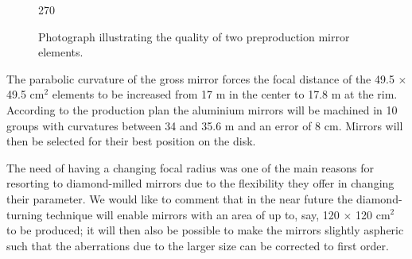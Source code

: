 \begin{figure}[htb]
\begin{center}
\begin{turn}{270}
\epsfxsize=9.2cm
\end{turn}
\caption{Photograph illustrating the
quality of two preproduction mirror elements.}
\label{fig-quality}
\end{center}
\end{figure}




The parabolic curvature of the gross mirror forces the focal distance of the
49.5 $\times$ 49.5 cm$^2$ elements to be increased from 17 m in the center
to 17.8 m at the rim. According to the production plan the aluminium mirrors
will be machined in 10 groups with curvatures between 34 and 35.6 m and an
error of 8 cm. Mirrors will then be selected for their best position on the
disk.

The need of having a changing focal radius was one of the main reasons for
resorting to diamond-milled mirrors due to the flexibility they offer in
changing their parameter. We would like to comment that in the near future
the diamond-turning technique will enable mirrors with an area of up to,
say, 120 $\times$ 120 cm$^2$ to be produced; it will then also be possible
to make the mirrors slightly aspheric such that the aberrations due to the
larger size can be corrected to first order.

